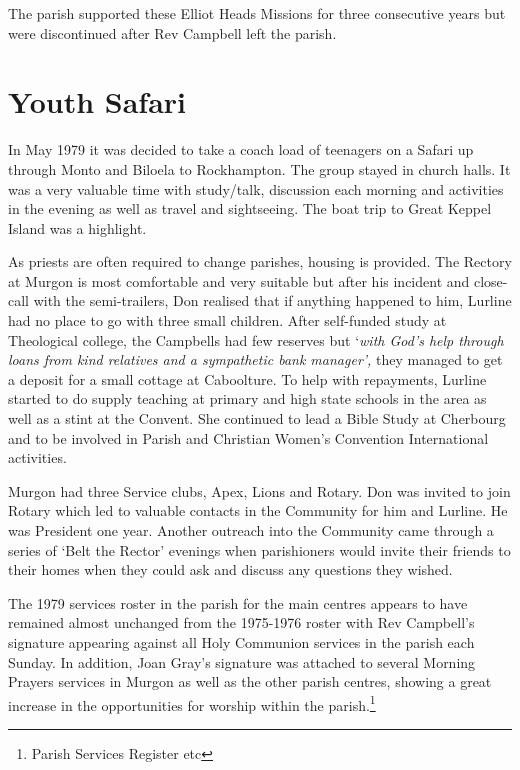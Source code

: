 The parish supported these Elliot Heads Missions for three consecutive years but were discontinued after Rev Campbell left the parish.

\hypertarget{youth-safari}{%
\section{Youth Safari}\label{youth-safari}}

In May 1979 it was decided to take a coach load of teenagers on a Safari up through Monto and Biloela to Rockhampton. The group stayed in church halls. It was a very valuable time with study/talk, discussion each morning and activities in the evening as well as travel and sightseeing. The boat trip to Great Keppel Island was a highlight.

As priests are often required to change parishes, housing is provided. The Rectory at Murgon is most comfortable and very suitable but after his incident and close-call with the semi-trailers, Don realised that if anything happened to him, Lurline had no place to go with three small children. After self-funded study at Theological college, the Campbells had few reserves but `\emph{with God's help through loans from kind relatives and a sympathetic bank manager',} they managed to get a deposit for a small cottage at Caboolture. To help with repayments, Lurline started to do supply teaching at primary and high state schools in the area as well as a stint at the Convent. She continued to lead a Bible Study at Cherbourg and to be involved in Parish and Christian Women's Convention International activities.

Murgon had three Service clubs, Apex, Lions and Rotary. Don was invited to join Rotary which led to valuable contacts in the Community for him and Lurline. He was President one year. Another outreach into the Community came through a series of `Belt the Rector' evenings when parishioners would invite their friends to their homes when they could ask and discuss any questions they wished.

The 1979 services roster in the parish for the main centres appears to have remained almost unchanged from the 1975-1976 roster with Rev Campbell's signature appearing against all Holy Communion services in the parish each Sunday. In addition, Joan Gray's signature was attached to several Morning Prayers services in Murgon as well as the other parish centres, showing a great increase in the opportunities for worship within the parish.\footnote{Parish Services Register etc}


